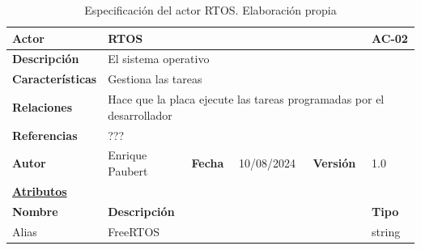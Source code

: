 \begin{table}[H]
    \begin{tabular}{|llllll|}
	\hline
	\multicolumn{1}{|l|}{\textbf{Actor}}		& \multicolumn{4}{l|}{RTOS} & AC-02		\\ \hline
	\multicolumn{1}{|l|}{\textbf{Descripción}}     	& \multicolumn{5}{l|}{El sistema operativo}	\\ \hline
	\multicolumn{1}{|l|}{\textbf{Características}}	& \multicolumn{5}{l|}{Gestiona las tareas}	\\ \hline
	\multicolumn{1}{|l|}{\textbf{Relaciones}}		& \multicolumn{5}{l|}{Hace que la placa ejecute las tareas programadas por el desarrollador}	\\ \hline
	\multicolumn{1}{|l|}{\textbf{Referencias}}     	& \multicolumn{5}{l|}{???}	\\ \hline
	\multicolumn{1}{|l|}{\textbf{Autor}}           	& \multicolumn{1}{l|}{Enrique Paubert}        & \multicolumn{1}{l|}{\textbf{Fecha}}        & \multicolumn{1}{l|}{10/08/2024}        & \multicolumn{1}{l|}{\textbf{Versión}}       & 1.0                   \\ \hline
	\multicolumn{6}{|l|}{\textbf{\underline{Atributos}}} \\ \hline %
	\multicolumn{1}{|l|}{\textbf{Nombre}}		& \multicolumn{4}{l|}{\textbf{Descripción}} &  \textbf{Tipo}  \\ \hline
	\multicolumn{1}{|l|}{ Alias }				& \multicolumn{4}{l|}{ FreeRTOS }  &  string      \\ \hline
    \end{tabular}
    \caption[Actor: RTOS]{Especificación del actor RTOS. Elaboración propia}
\end{table}

